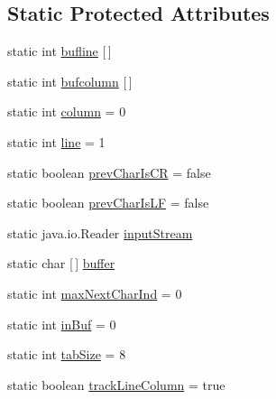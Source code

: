 \subsection*{Static Protected Attributes}
\begin{DoxyCompactItemize}
\item 
static int \mbox{\hyperlink{classorg_1_1tec_1_1comp_1_1interpreter_1_1_simple_char_stream_a25850e40eef27ede7bc442e111ee59a1}{bufline}} \mbox{[}$\,$\mbox{]}
\item 
static int \mbox{\hyperlink{classorg_1_1tec_1_1comp_1_1interpreter_1_1_simple_char_stream_a4b52c025c04bcfb0541654467879a841}{bufcolumn}} \mbox{[}$\,$\mbox{]}
\item 
static int \mbox{\hyperlink{classorg_1_1tec_1_1comp_1_1interpreter_1_1_simple_char_stream_adc24b04d91cf59041220e51ac4b67409}{column}} = 0
\item 
static int \mbox{\hyperlink{classorg_1_1tec_1_1comp_1_1interpreter_1_1_simple_char_stream_ae8f51ef07ca50ba64255f4059e9f5471}{line}} = 1
\item 
static boolean \mbox{\hyperlink{classorg_1_1tec_1_1comp_1_1interpreter_1_1_simple_char_stream_aa0ce4e99f9cd74039d79c68b7b525428}{prev\+Char\+Is\+CR}} = false
\item 
static boolean \mbox{\hyperlink{classorg_1_1tec_1_1comp_1_1interpreter_1_1_simple_char_stream_a767417fca76fbc0357940b07ed1d2759}{prev\+Char\+Is\+LF}} = false
\item 
static java.\+io.\+Reader \mbox{\hyperlink{classorg_1_1tec_1_1comp_1_1interpreter_1_1_simple_char_stream_a6452120661f0ff343b37f3051920eed2}{input\+Stream}}
\item 
static char \mbox{[}$\,$\mbox{]} \mbox{\hyperlink{classorg_1_1tec_1_1comp_1_1interpreter_1_1_simple_char_stream_a5dd77edf9f35c9dd46330b93bf641c4c}{buffer}}
\item 
static int \mbox{\hyperlink{classorg_1_1tec_1_1comp_1_1interpreter_1_1_simple_char_stream_a6e702dc13b1d4f988bc02bde24ccd278}{max\+Next\+Char\+Ind}} = 0
\item 
static int \mbox{\hyperlink{classorg_1_1tec_1_1comp_1_1interpreter_1_1_simple_char_stream_a1d3885baf1a5e242713e29d55d40610b}{in\+Buf}} = 0
\item 
static int \mbox{\hyperlink{classorg_1_1tec_1_1comp_1_1interpreter_1_1_simple_char_stream_a088b9b01e583fa25446d3e89c2c93af4}{tab\+Size}} = 8
\item 
static boolean \mbox{\hyperlink{classorg_1_1tec_1_1comp_1_1interpreter_1_1_simple_char_stream_a3a942108092ebfaa75ff3a02444c88ad}{track\+Line\+Column}} = true
\end{DoxyCompactItemize}


